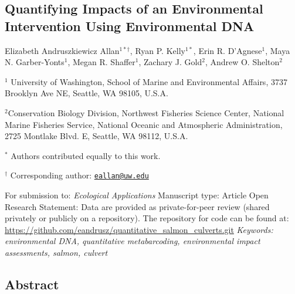 \documentclass[
]{article}
\author{}
\date{\vspace{-2.5em}}
\begin{document}
\hypertarget{quantifying-impacts-of-an-environmental-intervention-using-environmental-dna}{%
\subsection{Quantifying Impacts of an Environmental Intervention Using
Environmental
DNA}\label{quantifying-impacts-of-an-environmental-intervention-using-environmental-dna}}

Elizabeth Andruszkiewicz Allan\(^{1*\dagger}\), Ryan P. Kelly\(^{1*}\),
Erin R. D'Agnese\(^{1}\), Maya N. Garber-Yonts\(^{1}\), Megan R.
Shaffer\(^{1}\), Zachary J. Gold\(^{2}\), Andrew O. Shelton\(^{2}\)

\(^{1}\) University of Washington, School of Marine and Environmental
Affairs, 3737 Brooklyn Ave NE, Seattle, WA 98105, U.S.A.

\(^2\)Conservation Biology Division, Northwest Fisheries Science Center,
National Marine Fisheries Service, National Oceanic and Atmospheric
Administration, 2725 Montlake Blvd. E, Seattle, WA 98112, U.S.A.

\vspace{1em}

\(^{*}\) Authors contributed equally to this work.

\(^{\dagger}\) Corresponding author:
\href{mailto:eallan@uw.edu}{\nolinkurl{eallan@uw.edu}} \vspace{1em}

For submission to: \textit{Ecological Applications} \newline Manuscript
type: Article \newline Open Research Statement: Data are provided as
private-for-peer review (shared privately or publicly on a repository).
The repository for code can be found at:
\url{https://github.com/eandrusz/quantitative_salmon_culverts.git}
\newline \textit{Keywords: environmental DNA, quantitative metabarcoding, environmental impact assessments, salmon, culvert}

\newpage

\hypertarget{abstract}{%
\subsection{Abstract}\label{abstract}}
\end{document}
